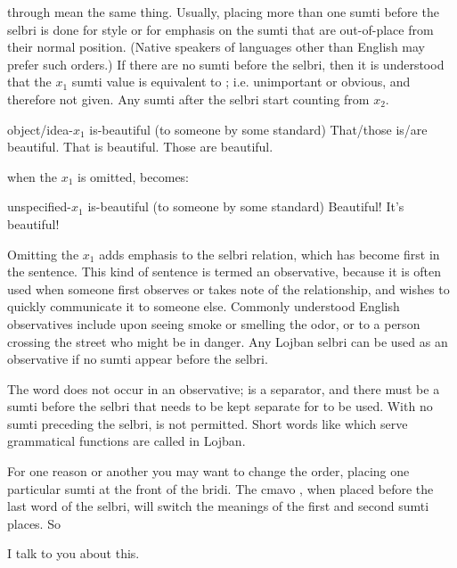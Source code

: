  through  mean the same thing. Usually, placing more than one sumti before the selbri is done for style or for emphasis on the sumti that are out-of-place from their normal position. (Native speakers of languages other than English may prefer such orders.) If there are no sumti before the selbri, then it is understood that the $x_1$ sumti value is equivalent to ; i.e. unimportant or obvious, and therefore not given. Any sumti after the selbri start counting from $x_2$.
\begin{example}
  \n
object/idea-$x_1$ is-beautiful (to someone by some standard)\n
That/those is/are beautiful.\n
That is beautiful.\n
Those are beautiful.
\end{example}

{\noindent}when the $x_1$ is omitted, becomes:
\begin{example}
\n
unspecified-$x_1$ is-beautiful (to someone by some standard)\n
Beautiful!\n
It's beautiful!
\end{example}

Omitting the $x_1$ adds emphasis to the selbri relation, which has become first in the sentence. This kind of sentence is termed an observative, because it is often used when someone first observes or takes note of the relationship, and wishes to quickly communicate it to someone else. Commonly understood English observatives include  upon seeing smoke or smelling the odor, or  to a person crossing the street who might be in danger. Any Lojban selbri can be used as an observative if no sumti appear before the selbri.

The word  does not occur in an observative;  is a separator, and there must be a sumti before the selbri that needs to be kept separate for  to be used. With no sumti preceding the selbri,  is not permitted. Short words like  which serve grammatical functions are called  in Lojban.



For one reason or another you may want to change the order, placing one particular sumti at the front of the bridi. The cmavo , when placed before the last word of the selbri, will switch the meanings of the first and second sumti places. So
\begin{example}
   \n
I talk to you about this.
\end{example}

